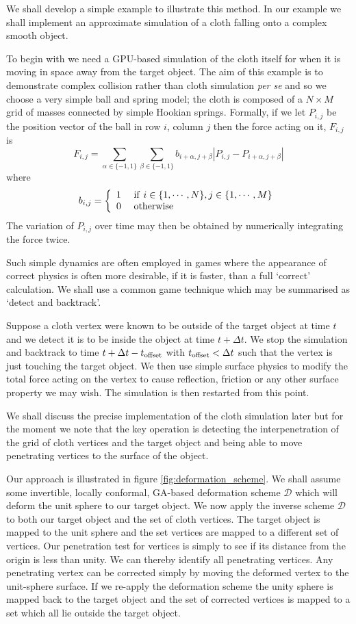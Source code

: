 We shall develop a simple example to illustrate this method. In our example we
shall implement an approximate simulation of a cloth falling onto a complex
smooth object. 

To begin with we need a GPU-based simulation of the cloth itself for when
it is moving in space away from the target object. The aim of this example is
to demonstrate complex collision rather than cloth simulation \emph{per se}
and so we choose a very simple ball and spring model; the cloth is composed
of a $N\times M$ grid of masses connected by simple Hookian springs. Formally, 
if we let $P_{i,j}$
be the position vector of the ball in row $i$, column $j$ then the force acting
on it, $F_{i,j}$ is
\[
F_{i,j} = \sum_{\alpha \in \{-1,1\}} \sum_{\beta \in \{-1,1\}} 
b_{i+\alpha, j+\beta} 
\left| P_{i,j} - P_{i+\alpha, j+\beta} \right|
\]
where
\[
b_{i,j} = 
\left\{
\begin{array}{ll}
1 & {\rm ~if~} i \in \{1, \cdots, N\}, j \in \{1, \cdots, M\} \\
0 & {\rm ~otherwise}
\end{array}
\right.
\]
The variation of $P_{i,j}$ over time may then be obtained by numerically
integrating the force twice.

Such simple dynamics are often employed in games where the appearance of
correct physics is often more desirable, if it is faster, than a full
`correct' calculation. We shall use a common game technique
which may be summarised as `detect and backtrack'.

Suppose a cloth vertex were known to be outside of the target object at time
$t$ and we detect it is to be inside the object at time $t + \Delta t$. 
We stop the simulation and backtrack to time $t + \Delta t - t_{\rm offset}$
with $t_{\rm offset} < \Delta t$ such that the vertex is just touching
the target object. We then use simple surface physics to modify the total
force acting on the vertex to cause reflection, friction or any other 
surface property we may wish. The simulation is then restarted from this point.

We shall discuss the precise implementation of the cloth simulation later but
for the moment we note that the key operation is detecting the interpenetration
of the grid of cloth vertices and the target object and being able to move 
penetrating vertices to the surface of the object.

Our approach is illustrated in figure \ref{fig:deformation_scheme}. We shall
assume some invertible, locally conformal, GA-based deformation scheme
$\mathcal{D}$ which will deform the unit sphere to our target object.  We now
apply the inverse scheme $\mathcal{D}$ to both our target object and the set
of cloth vertices. The target object is mapped to the unit sphere and the set
vertices are mapped to a different set of vertices.  Our penetration test for
vertices is simply to see if its distance from the origin is less than unity.
We can thereby identify all penetrating vertices. Any penetrating vertex can
be corrected simply by moving the deformed vertex to the unit-sphere surface.
If we re-apply the deformation scheme the unity sphere is mapped back to the
target object and the set of corrected vertices is mapped to a set which all
lie outside the target object.

